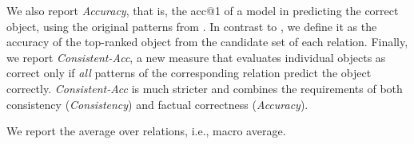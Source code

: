 
We also report \textit{Accuracy}, that is, the acc@1 of a model in predicting the correct object, using the original patterns from \citet{lama}. In contrast to \citet{lama}, we define it as the accuracy of the top-ranked object from the candidate set of each relation.
Finally, we report \emph{Consistent-Acc}, a new measure that evaluates individual objects as correct only
if \emph{all} patterns of the corresponding relation predict the object
correctly. \textit{Consistent-Acc} is  much stricter  and combines the
requirements of both consistency (\textit{Consistency}) and factual correctness (\textit{Accuracy}).


We report the average over relations, i.e., macro average.
